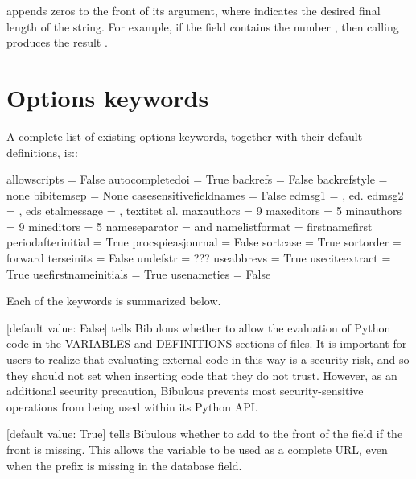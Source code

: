 \documentclass[letterpaper,10pt,english]{sphinxmanual}
\begin{document}
 appends zeros to the front of its argument, where  indicates the desired final length of the string. For example, if the field  contains the number , then calling  produces the result .


\section{Options keywords}
\label{\detokenize{guidelines_for_writing_style_templates:options-keywords}}
A complete list of existing options keywords, together with their default definitions, is::

%
\begin{sphinxVerbatim}[commandchars=\\\{\}]
allow\PYGZus{}scripts = False
autocomplete\PYGZus{}doi = True
backrefs = False
backrefstyle = none
bibitemsep = None
case\PYGZus{}sensitive\PYGZus{}field\PYGZus{}names = False
edmsg1 = , ed.
edmsg2 = , eds
etal\PYGZus{}message = , \PYGZbs{}\PYGZbs{}textit\PYGZob{}et al.\PYGZcb{}
maxauthors = 9
maxeditors = 5
minauthors = 9
mineditors = 5
name\PYGZus{}separator = and
namelist\PYGZus{}format = first\PYGZus{}name\PYGZus{}first
period\PYGZus{}after\PYGZus{}initial = True
procspie\PYGZus{}as\PYGZus{}journal = False
sort\PYGZus{}case = True
sort\PYGZus{}order = forward
terse\PYGZus{}inits = False
undefstr = ???
use\PYGZus{}abbrevs = True
use\PYGZus{}citeextract = True
use\PYGZus{}firstname\PYGZus{}initials = True
use\PYGZus{}name\PYGZus{}ties = False
\end{sphinxVerbatim}

Each of the keywords is summarized below.

 {[}default value: False{]} tells Bibulous whether to allow the evaluation of Python code in the VARIABLES and DEFINITIONS sections of  files. It is important for users to realize that evaluating external code in this way is a security risk, and so they should not set  when inserting code that they do not trust. However, as an additional security precaution, Bibulous prevents most security-sensitive operations from being used within its Python API.

 {[}default value: True{]} tells Bibulous whether to add  to the front of the  field if the front is missing. This allows the  variable to be used as a complete URL, even when the prefix is missing in the database field.
\end{document}
